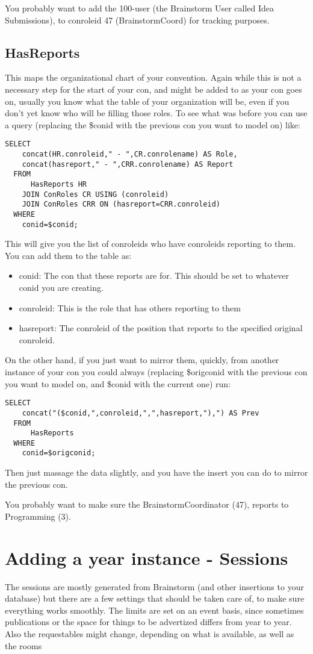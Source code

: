 \documentclass[captions=tablesignature]{scrartcl}
\begin{document}
You probably want to add the 100-user (the Brainstorm User called
Idea Submissions), to conroleid 47 (BrainstormCoord) for tracking
purposes.

\subsection{HasReports}
\label{sec-12-3}
This maps the organizational chart of your convention.  Again while
this is not a necessary step for the start of your con, and might
be added to as your con goes on, usually you know what the table of
your organization will be, even if you don't yet know who will be
filling those roles.  To see what was before you can use a query
(replacing the \$conid with the previous con you want to model on)
like:
\begin{verbatim}
SELECT
    concat(HR.conroleid," - ",CR.conrolename) AS Role,
    concat(hasreport," - ",CRR.conrolename) AS Report
  FROM
      HasReports HR
    JOIN ConRoles CR USING (conroleid)
    JOIN ConRoles CRR ON (hasreport=CRR.conroleid)
  WHERE
    conid=$conid;
\end{verbatim}
This will give you the list of conroleids who have conroleids
reporting to them.  You can add them to the table as:
\begin{itemize}
\item conid: The con that these reports are for.  This should be set
to whatever conid you are creating.
\item conroleid: This is the role that has others reporting to them
\item hasreport: The conroleid of the position that reports to the
specified original conroleid.
\end{itemize}

On the other hand, if you just want to mirror them, quickly, from
another instance of your con you could always (replacing \$origconid
with the previous con you want to model on, and \$conid with the
current one) run:
\begin{verbatim}
SELECT
    concat("($conid,",conroleid,",",hasreport,"),") AS Prev
  FROM
      HasReports
  WHERE
    conid=$origconid;
\end{verbatim}
Then just massage the data slightly, and you have the insert you
can do to mirror the previous con.

You probably want to make sure the BrainstormCoordinator (47),
reports to Programming (3).

\section{Adding a year instance - Sessions}
\label{sec-13}
The sessions are mostly generated from Brainstorm (and other
insertions to your database) but there are a few settings that
should be taken care of, to make sure everything works smoothly.
The limits are set on an event basis, since sometimes publications
or the space for things to be advertized differs from year to year.
Also the requestables might change, depending on what is available,
as well as the rooms
\end{document}
